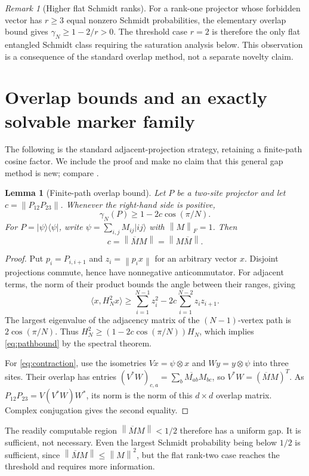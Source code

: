 \documentclass[11pt,a4paper]{article}
\newtheorem{lemma}[theorem]{Lemma}
\theoremstyle{remark}\newtheorem{remark}[theorem]{Remark}
\newcommand{\ket}[1]{\lvert #1\rangle}
\newcommand{\bra}[1]{\langle #1\rvert}
\newcommand{\norm}[1]{\left\lVert #1\right\rVert}
\begin{document}
\begin{remark}[Higher flat Schmidt ranks]
For a rank-one projector whose forbidden vector has $r\ge3$ equal nonzero Schmidt probabilities, the elementary overlap bound gives $\gamma_N\ge1-2/r>0$. The threshold case $r=2$ is therefore the only flat entangled Schmidt class requiring the saturation analysis below. This observation is a consequence of the standard overlap method, not a separate novelty claim.
\end{remark}

\section{Overlap bounds and an exactly solvable marker family}
The following is the standard adjacent-projection strategy, retaining a finite-path cosine factor. We include the proof and make no claim that this general gap method is new; compare \cite{Lemm,HJL}.
\begin{lemma}[Finite-path overlap bound]\label{lem:overlap}
Let $P$ be a two-site projector and let $c=\norm{P_{12}P_{23}}$. Whenever the right-hand side is positive,
\begin{equation}\label{eq:pathbound}
 \gamma_N(P)\ge1-2c\cos(\pi/N).
\end{equation}
For $P=\ket\psi\bra\psi$, write $\psi=\sum_{i,j}M_{ij}\ket{ij}$ with $\norm M_F=1$. Then
\begin{equation}\label{eq:contraction}
 c=\norm{\overline M M}=\norm{M\overline M}.
\end{equation}
\end{lemma}
\begin{proof}
Put $p_i=P_{i,i+1}$ and $z_i=\norm{p_i x}$ for an arbitrary vector $x$. Disjoint projections commute, hence have nonnegative anticommutator. For adjacent terms, the norm of their product bounds the angle between their ranges, giving
\[
 \langle x,H_N^2x\rangle\ge\sum_{i=1}^{N-1}z_i^2
       -2c\sum_{i=1}^{N-2}z_i z_{i+1}.
\]
The largest eigenvalue of the adjacency matrix of the $(N-1)$-vertex path is $2\cos(\pi/N)$. Thus $H_N^2\ge(1-2c\cos(\pi/N))H_N$, which implies \eqref{eq:pathbound} by the spectral theorem.

For \eqref{eq:contraction}, use the isometries $Vx=\psi\otimes x$ and $Wy=y\otimes\psi$ into three sites. Their overlap has entries
$(V^*W)_{c,a}=\sum_b\overline{M_{ab}}M_{bc}$, so
$V^*W=(\overline M M)^T$. As $P_{12}P_{23}=V(V^*W)W^*$, its norm is the norm of this $d\times d$ overlap matrix. Complex conjugation gives the second equality.
\end{proof}
The readily computable region $\norm{\overline M M}<1/2$ therefore has a uniform gap. It is sufficient, not necessary. Even the largest Schmidt probability being below $1/2$ is sufficient, since $\norm{\overline M M}\le\norm M^2$, but the flat rank-two case reaches the threshold and requires more information.
\end{document}
